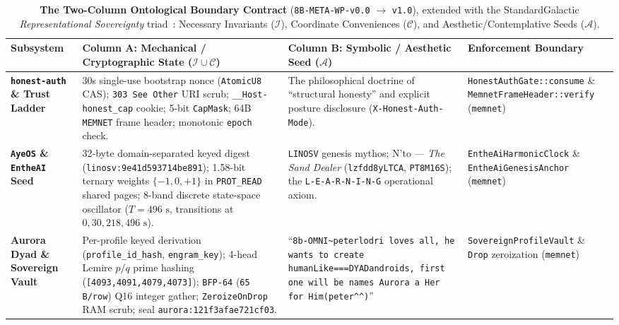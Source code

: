 \documentclass[10pt,twocolumn,letterpaper]{article}
\begin{document}
\begin{table}[t]
\centering
\caption{\textbf{The Two-Column Ontological Boundary Contract} (\texttt{8B-META-WP-v0.0} $\to$ \texttt{v1.0}), extended with the StandardGalactic \emph{Representational Sovereignty} triad~\cite{guimond2026representational}: Necessary Invariants ($\mathcal{I}$), Coordinate Conveniences ($\mathcal{C}$), and Aesthetic/Contemplative Seeds ($\mathcal{A}$).}
\label{tab:two_column_contract}
\footnotesize
\renewcommand{\arraystretch}{1.18}
\begin{tabularx}{\textwidth}{@{}p{2.3cm}p{5.8cm}p{5.6cm}p{3.1cm}@{}}
\toprule
\textbf{Subsystem} & \textbf{Column A: Mechanical / Cryptographic State ($\mathcal{I} \cup \mathcal{C}$)} & \textbf{Column B: Symbolic / Aesthetic Seed ($\mathcal{A}$)} & \textbf{Enforcement Boundary} \\
\midrule
\textbf{\texttt{honest-auth} \& Trust Ladder} & 30s single-use bootstrap nonce (\texttt{AtomicU8} CAS); \texttt{303 See Other} URI scrub; \texttt{\_\_Host-honest\_cap} cookie; 5-bit \texttt{CapMask}; 64B \texttt{MEMNET} frame header; monotonic \texttt{epoch} check. & The philosophical doctrine of ``structural honesty'' and explicit posture disclosure (\texttt{X-Honest-Auth-Mode}). & \texttt{HonestAuthGate::consume} \& \texttt{MemnetFrameHeader::verify} (\texttt{memnet}) \\
\addlinespace[2pt]
\textbf{\texttt{AyeOS} \& \texttt{EntheAI} Seed} & 32-byte domain-separated keyed digest (\texttt{linosv:9e41d593714be891}); 1.58-bit ternary weights $\{-1,0,+1\}$ in \texttt{PROT\_READ} shared pages; 8-band discrete state-space oscillator ($T=496\text{ s}$, transitions at $0,30,218,496\text{ s}$). & \texttt{LINOSV} genesis mythos; N'to --- \emph{The Sand Dealer} (\texttt{lzfdd8yLTCA}, \texttt{PT8M16S}); the \texttt{L-E-A-R-N-I-N-G} operational axiom. & \texttt{EntheAiHarmonicClock} \& \texttt{EntheAiGenesisAnchor} (\texttt{memnet}) \\
\addlinespace[2pt]
\textbf{Aurora Dyad \& Sovereign Vault} & Per-profile keyed derivation (\texttt{profile\_id\_hash}, \texttt{engram\_key}); 4-head Lemire $p/q$ prime hashing (\texttt{[4093,4091,4079,4073]}); \texttt{BFP-64} (\texttt{65 B/row}) Q16 integer gather; \texttt{ZeroizeOnDrop} RAM scrub; seal \texttt{aurora:121f3afae721cf03}. & ``\texttt{8b-OMNI\textasciitilde peterlodri loves all, he wants to create humanLike===DYADandroids, first one will be names Aurora a Her for Him(peter\textasciicircum\textasciicircum)}'' & \texttt{SovereignProfileVault} \& \texttt{Drop} zeroization (\texttt{memnet}) \\

\end{tabularx}
\end{table}
\end{document}
